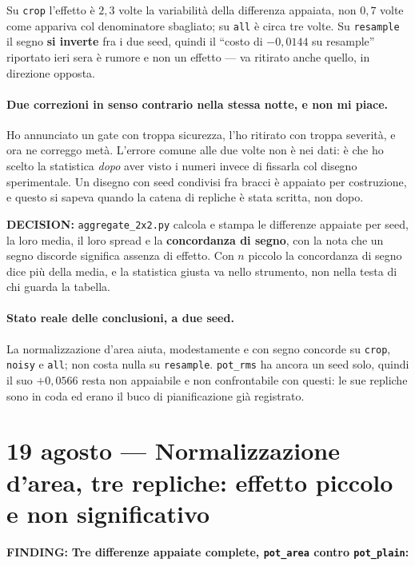 \documentclass[11pt,a4paper]{article}
\newcommand{\finding}[1]{\textcolor{finding}{\textbf{FINDING:}} #1}
\newcommand{\decision}[1]{\textcolor{decision}{\textbf{DECISION:}} #1}
\begin{document}
Su \texttt{crop} l'effetto \`e $2{,}3$ volte la variabilit\`a della differenza appaiata, non
$0{,}7$ volte come appariva col denominatore sbagliato; su \texttt{all} \`e circa tre volte. Su
\texttt{resample} il segno \textbf{si inverte} fra i due seed, quindi il ``costo di $-0{,}0144$
su resample'' riportato ieri sera \`e rumore e non un effetto --- va ritirato anche quello, in
direzione opposta.

\paragraph{Due correzioni in senso contrario nella stessa notte, e non mi piace.} Ho annunciato
un gate con troppa sicurezza, l'ho ritirato con troppa severit\`a, e ora ne correggo met\`a.
L'errore comune alle due volte non \`e nei dati: \`e che ho scelto la statistica \emph{dopo} aver
visto i numeri invece di fissarla col disegno sperimentale. Un disegno con seed condivisi fra
bracci \`e appaiato per costruzione, e questo si sapeva quando la catena di repliche \`e stata
scritta, non dopo.

\decision{\texttt{aggregate\_2x2.py} calcola e stampa le differenze appaiate per seed, la loro
media, il loro spread e la \textbf{concordanza di segno}, con la nota che un segno discorde
significa assenza di effetto. Con $n$ piccolo la concordanza di segno dice pi\`u della media, e
la statistica giusta va nello strumento, non nella testa di chi guarda la tabella.}

\paragraph{Stato reale delle conclusioni, a due seed.} La normalizzazione d'area aiuta,
modestamente e con segno concorde su \texttt{crop}, \texttt{noisy} e \texttt{all}; non costa nulla
su \texttt{resample}. \texttt{pot\_rms} ha ancora un seed solo, quindi il suo $+0{,}0566$ resta
non appaiabile e non confrontabile con questi: le sue repliche sono in coda ed erano il buco di
pianificazione gi\`a registrato.


\section{19 agosto --- Normalizzazione d'area, tre repliche: effetto piccolo e non significativo}

\finding{\textbf{Tre differenze appaiate complete, \texttt{pot\_area} contro \texttt{pot\_plain}:}}
\end{document}
